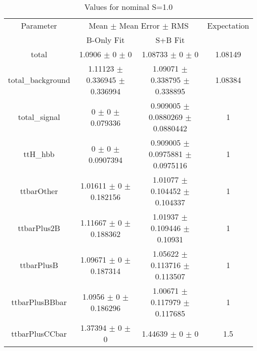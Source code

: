 \begin{table}
\centering
\caption{Values for nominal S=1.0}
\begin{tabular}{cccc}
\toprule
Parameter & \multicolumn{2}{c}{Mean $\pm$ Mean Error $\pm$ RMS} & Expectation\\
 & B-Only Fit & S+B Fit & \\
\midrule
total & \num{1.0906} $\pm$ \num{0} $\pm$ \num{0} & \num{1.08733} $\pm$ \num{0} $\pm$ \num{0} & \num{1.08149}\\
total\_background & \num{1.11123} $\pm$ \num{0.336945} $\pm$ \num{0.336994} & \num{1.09071} $\pm$ \num{0.338795} $\pm$ \num{0.338895} & \num{1.08384}\\
total\_signal & \num{0} $\pm$ \num{0} $\pm$ \num{0.079336} & \num{0.909005} $\pm$ \num{0.0880269} $\pm$ \num{0.0880442} & \num{1}\\
ttH\_hbb & \num{0} $\pm$ \num{0} $\pm$ \num{0.0907394} & \num{0.909005} $\pm$ \num{0.0975881} $\pm$ \num{0.0975116} & \num{1}\\
ttbarOther & \num{1.01611} $\pm$ \num{0} $\pm$ \num{0.182156} & \num{1.01077} $\pm$ \num{0.104452} $\pm$ \num{0.104337} & \num{1}\\
ttbarPlus2B & \num{1.11667} $\pm$ \num{0} $\pm$ \num{0.188362} & \num{1.01937} $\pm$ \num{0.109446} $\pm$ \num{0.10931} & \num{1}\\
ttbarPlusB & \num{1.09671} $\pm$ \num{0} $\pm$ \num{0.187314} & \num{1.05622} $\pm$ \num{0.113716} $\pm$ \num{0.113507} & \num{1}\\
ttbarPlusBBbar & \num{1.0956} $\pm$ \num{0} $\pm$ \num{0.186296} & \num{1.00671} $\pm$ \num{0.117979} $\pm$ \num{0.117685} & \num{1}\\
ttbarPlusCCbar & \num{1.37394} $\pm$ \num{0} $\pm$ \num{0} & \num{1.44639} $\pm$ \num{0} $\pm$ \num{0} & \num{1.5}\\
\bottomrule
\end{tabular}
\end{table}